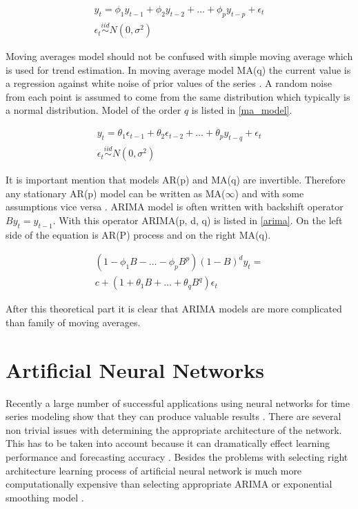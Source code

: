     \begin{eqnarray} \label{ar_model}
        y_t = \phi_1 y_{t-1} + \phi_2 y_{t-2} + \dots + \phi_p y_{t-p} + \epsilon_t \\ \nonumber
        \epsilon_t \overset{iid}{\sim} N(0, \sigma^2)
    \end{eqnarray}

    Moving averages model should not be confused with simple moving average which is
    used for trend estimation. In moving average model MA(q) the current value is
    a regression against white noise of prior values of the series \cite{wiki-ma-model}. A random noise from
    each point is assumed to come from the same distribution which typically is 
    a normal distribution. Model of the order $q$ is listed in \ref{ma_model}.

    \begin{eqnarray} \label{ma_model}
        y_t = \theta_1 \epsilon_{t-1} + \theta_2 \epsilon_{t-2} + \dots + \theta_p y_{t-q} + \epsilon_t \\ \nonumber
        \epsilon_t \overset{iid}{\sim} N(0, \sigma^2)
    \end{eqnarray}

    It is important mention that models AR(p) and MA(q) are invertible.
    Therefore any stationary AR(p) model can be written as MA($\infty$) and with some assumptions
    vice versa \cite{brockwell}. ARIMA model is often written with backshift operator $By_t=y_{t-1}$.
    With this operator ARIMA(p, d, q) is listed in \ref{arima}. On the left side of the equation is AR(P) process
    and on the right MA(q).

    \begin{eqnarray} \label{arima}
        (1- \phi_1B - \dots - \phi_pB^p)(1-B)^d y_t = \\ \nonumber
         c + (1+\theta_1B+\dots+\theta_qB^q) \epsilon_t
    \end{eqnarray}

    After this theoretical part it is clear that ARIMA models are more complicated than family of moving averages.

    \section{Artificial Neural Networks}
    Recently a large number of successful applications using neural networks for time series modeling show that they
    can produce valuable results \cite{ann-forecasting-state-art}. There are several non trivial issues with
    determining the appropriate architecture of the network. This has to be taken into account because it can
    dramatically effect learning performance and forecasting accuracy \cite{ann-model-selecting}.
    Besides the problems with selecting right architecture learning process of artificial neural network is much more
    computationally expensive than selecting appropriate ARIMA or exponential smoothing model \cite{ann-forecasting}.

